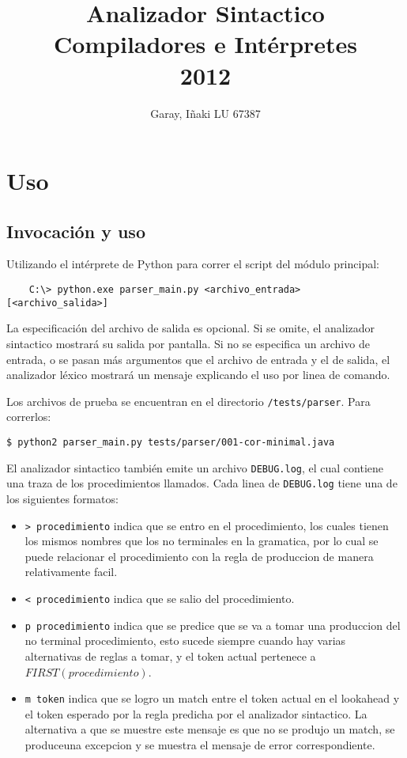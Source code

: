 \documentclass [a4paper,titlepage]{report}
\title{Analizador Sintactico\\Compiladores e Intérpretes \\2012}
\author{Garay, I\~{n}aki LU 67387}
\begin{document}
\maketitle

\tableofcontents

\newpage

\section{Uso}

\subsection{Invocación y uso}

Utilizando el intérprete de Python para correr el script del módulo principal:

\begin{verbatim}
    C:\> python.exe parser_main.py <archivo_entrada> [<archivo_salida>]
\end{verbatim}

La especificación del archivo de salida es opcional. 
Si se omite, el analizador sintactico mostrará su salida por pantalla.
Si no se especifica un archivo de entrada, o se pasan más argumentos que el 
archivo de entrada y el de salida, el analizador léxico mostrará un mensaje 
explicando el uso por linea de comando.

Los archivos de prueba se encuentran en el directorio \texttt{/tests/parser}.
Para correrlos:

\noindent
\begin{verbatim}
$ python2 parser_main.py tests/parser/001-cor-minimal.java
\end{verbatim}

El analizador sintactico también emite un archivo \texttt{DEBUG.log}, el cual
contiene una traza de los procedimientos llamados. Cada linea de
\texttt{DEBUG.log} tiene una de los siguientes formatos:

\begin{itemize}
\item \texttt{> procedimiento} indica que se entro en el procedimiento, los
cuales tienen los mismos nombres que los no terminales en la gramatica, por lo
cual se puede relacionar el procedimiento con la regla de produccion de manera
relativamente facil.
\item \texttt{< procedimiento} indica que se salio del procedimiento.
\item \texttt{p procedimiento} indica que se predice que se va a tomar una
produccion del no terminal procedimiento, esto sucede siempre cuando hay varias
alternativas de reglas a tomar, y el token actual pertenece
a $FIRST(procedimiento)$.
\item \texttt{m token} indica que se logro un match entre el token actual en el
lookahead y el token esperado por la regla predicha por el analizador
sintactico. La alternativa a que se muestre este mensaje es que no se produjo un
match, se produceuna excepcion y se muestra el mensaje de error correspondiente.
\end{itemize}
\end{document}
